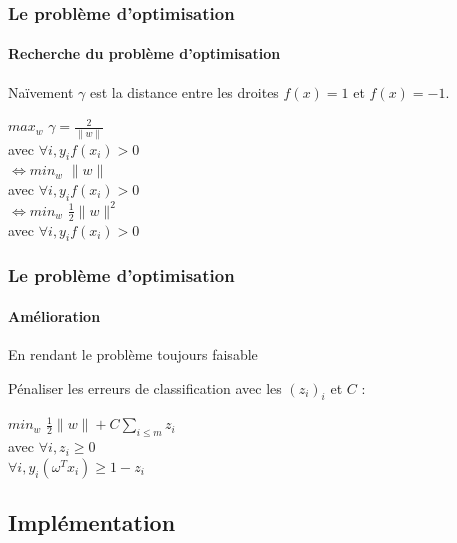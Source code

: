 \documentclass{beamer}
\begin{document}
\begin{frame}
\frametitle{Le problème d'optimisation}
\framesubtitle{Recherche du problème d'optimisation}

\begin{block}{Naïvement}
$\gamma$ est la distance entre les droites $f(x) = 1$ et $f(x) = -1$.

      \begin{center}
        $max_{w}$ $\gamma = \frac{2}{\|w\|}$\\
        avec $\forall i, y_i f(x_i) > 0$\\

       \bigskip
        $\Leftrightarrow min_{w}$ $\|w\|$ \\
        avec $\forall i, y_i f(x_i) > 0$\\
       \bigskip
        $\Leftrightarrow min_{w}$ $\frac{1}{2} \|w\|^2$\\
        avec $\forall i, y_i f(x_i) > 0$\\
      \end{center}

\end{block}

\end{frame}

\begin{frame}
\frametitle{Le problème d'optimisation}
\framesubtitle{Amélioration}

\begin{block}{En rendant le problème toujours faisable}

Pénaliser les erreurs de classification avec les $(z_i)_i$ et $C$ :

           \begin{center}
           $min_{w}$ $\frac{1}{2} \|w\| + C \sum_{i \leq m}z_i$\\
           avec $\forall i, z_i \geq 0$\\
           $\forall i, y_i (\omega^{T} x_i) \geq 1 - z_i$\\
           \end{center}

\end{block}

\end{frame}

\subsection{Implémentation}

\begin{frame}
\tableofcontents[currentsubsection]
\end{frame}
\end{document}
